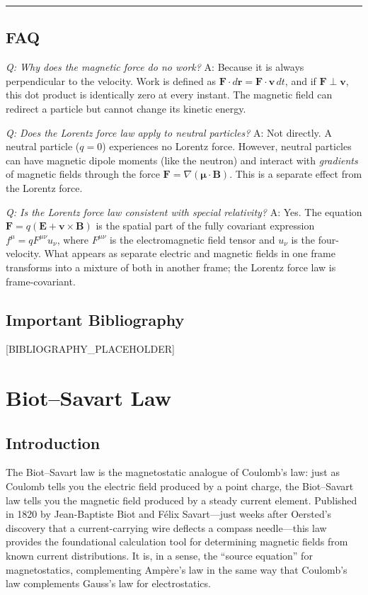 \documentclass[11pt,openright]{book}
\begin{document}
\bigskip
\hrule
\bigskip
\section*{FAQ}

\textit{Q: Why does the magnetic force do no work?}
A: Because it is always perpendicular to the velocity. Work is defined as $\mathbf{F}\cdot d\mathbf{r} = \mathbf{F}\cdot\mathbf{v}\,dt$, and if $\mathbf{F}\perp\mathbf{v}$, this dot product is identically zero at every instant. The magnetic field can redirect a particle but cannot change its kinetic energy.

\textit{Q: Does the Lorentz force law apply to neutral particles?}
A: Not directly. A neutral particle ($q=0$) experiences no Lorentz force. However, neutral particles can have magnetic dipole moments (like the neutron) and interact with \emph{gradients} of magnetic fields through the force $\mathbf{F} = \nabla(\boldsymbol{\mu}\cdot\mathbf{B})$. This is a separate effect from the Lorentz force.

\textit{Q: Is the Lorentz force law consistent with special relativity?}
A: Yes. The equation $\mathbf{F} = q(\mathbf{E} + \mathbf{v}\times\mathbf{B})$ is the spatial part of the fully covariant expression $f^\mu = qF^{\mu\nu}u_\nu$, where $F^{\mu\nu}$ is the electromagnetic field tensor and $u_\nu$ is the four-velocity. What appears as separate electric and magnetic fields in one frame transforms into a mixture of both in another frame; the Lorentz force law is frame-covariant.
\section*{Important Bibliography}

[BIBLIOGRAPHY_PLACEHOLDER]


\chapter{Biot--Savart Law}

\section*{Introduction}

The Biot--Savart law is the magnetostatic analogue of Coulomb's law: just as Coulomb tells you the electric field produced by a point charge, the Biot--Savart law tells you the magnetic field produced by a steady current element. Published in 1820 by Jean-Baptiste Biot and Félix Savart---just weeks after Oersted's discovery that a current-carrying wire deflects a compass needle---this law provides the foundational calculation tool for determining magnetic fields from known current distributions. It is, in a sense, the ``source equation'' for magnetostatics, complementing Ampère's law in the same way that Coulomb's law complements Gauss's law for electrostatics.
\end{document}
